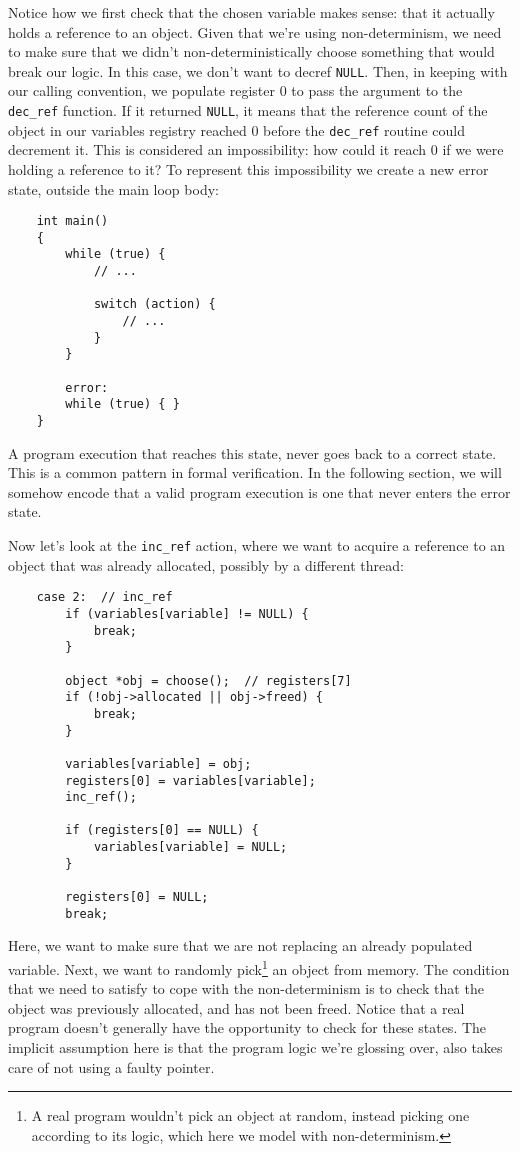 Notice how we first check that the chosen variable makes sense: that it actually holds a reference to an object.
Given that we're using non-determinism, we need to make sure that we didn't non-deterministically choose something that would break our logic.
In this case, we don't want to decref \texttt{NULL}.
Then, in keeping with our calling convention, we populate register 0 to pass the argument to the \texttt{dec\_ref} function.
If it returned \texttt{NULL}, it means that the reference count of the object in our variables registry reached 0 before the \texttt{dec\_ref} routine could decrement it.
This is considered an impossibility: how could it reach 0 if we were holding a reference to it?
To represent this impossibility we create a new error state, outside the main loop body:
\begin{verbatim}
	int main()
	{
	    while (true) {
	        // ...

	        switch (action) {
	            // ...
	        }
	    }

	    error:
	    while (true) { }
	}
\end{verbatim}

A program execution that reaches this state, never goes back to a correct state.
This is a common pattern in formal verification.
In the following section, we will somehow encode that a valid program execution is one that never enters the error state.

Now let's look at the \texttt{inc\_ref} action, where we want to acquire a reference to an object that was already allocated, possibly by a different thread:
\begin{verbatim}
	case 2:  // inc_ref
        if (variables[variable] != NULL) {
            break;
        }

        object *obj = choose();  // registers[7]
        if (!obj->allocated || obj->freed) {
            break;
        }

        variables[variable] = obj;
        registers[0] = variables[variable];
        inc_ref();

        if (registers[0] == NULL) {
            variables[variable] = NULL;
        }

        registers[0] = NULL;
        break;
\end{verbatim}

Here, we want to make sure that we are not replacing an already populated variable.
Next, we want to randomly pick\footnote{%
	A real program wouldn't pick an object at random, instead picking one according to its logic, which here we model with non-determinism.
} an object from memory.
The condition that we need to satisfy to cope with the non-determinism is to check that the object was previously allocated, and has not been freed.
Notice that a real program doesn't generally have the opportunity to check for these states.
The implicit assumption here is that the program logic we're glossing over, also takes care of not using a faulty pointer.

